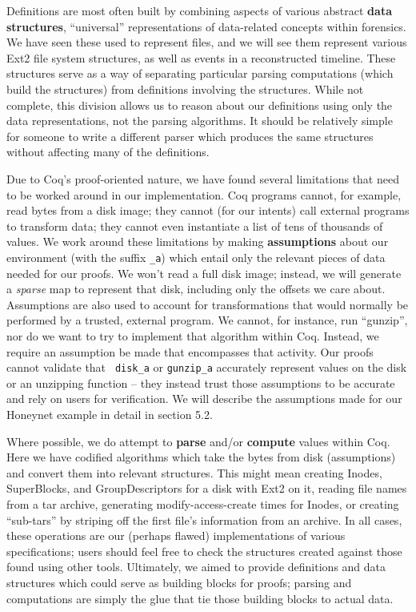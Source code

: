 \documentclass[nocopyrightspace]{sigplanconf}
\begin{document}
Definitions are most often built by combining aspects of various abstract {\bf
data structures}, ``universal'' representations of data-related concepts
within forensics. We have seen these used to represent files, and we will see
them represent various Ext2 file system structures, as well as events in a
reconstructed timeline. These structures serve as a way of separating
particular parsing computations (which build the structures) from definitions
involving the structures. While not complete, this division allows us to
reason about our definitions using only the data representations, not the
parsing algorithms. It should be relatively simple for someone to write a
different parser which produces the same structures without affecting many of
the definitions.

Due to Coq's proof-oriented nature, we have found several limitations that
need to be worked around in our implementation. Coq programs cannot, for
example, read bytes from a disk image; they cannot (for our intents) call
external programs to transform data; they cannot even instantiate a list of
tens of thousands of values. We work around these limitations by making {\bf
assumptions} about our environment (with the suffix {\tt \_a}) which entail
only the relevant pieces of data needed for our proofs. We won't read a full
disk image; instead, we will generate a {\it sparse} map to represent that
disk, including only the offsets we care about.  Assumptions are also used to
account for transformations that would normally be performed by a trusted,
external program. We cannot, for instance, run ``gunzip'', nor do we want to
try to implement that algorithm within Coq.  Instead, we require an assumption
be made that encompasses that activity. Our proofs cannot validate that {\tt
disk\_a} or {\tt gunzip\_a} accurately represent values on the disk or an
unzipping function -- they instead trust those assumptions to be accurate and
rely on users for verification. We will describe the assumptions made for our
Honeynet example in detail in section 5.2.

Where possible, we do attempt to {\bf parse} and/or {\bf compute} values
within Coq. Here we have codified algorithms which take the bytes from disk
(assumptions) and convert them into relevant structures. This might mean
creating Inodes, SuperBlocks, and GroupDescriptors for a disk with Ext2 on it,
reading file names from a tar archive, generating modify-access-create times
for Inodes, or creating ``sub-tars'' by striping off the first file's
information from an archive. In all cases, these operations are our (perhaps
flawed) implementations of various specifications; users should feel free to
check the structures created against those found using other tools.
Ultimately, we aimed to provide definitions and data structures which could
serve as building blocks for proofs; parsing and computations are simply the
glue that tie those building blocks to actual data.
\end{document}
